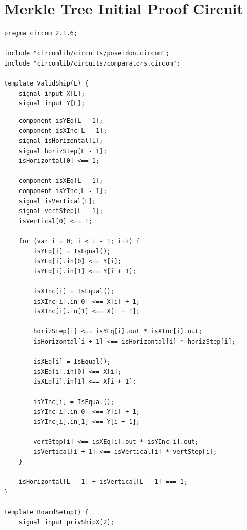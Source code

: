 \section{Merkle Tree Initial Proof Circuit}
\label{sec:initialProofCircuit}

\begin{listing}[H]
    \ContinuedFloat*
    \begin{verbatim}
pragma circom 2.1.6;

include "circomlib/circuits/poseidon.circom";
include "circomlib/circuits/comparators.circom";

template ValidShip(L) {
    signal input X[L];
    signal input Y[L];
    \end{verbatim}
    \caption{Merkle tree commitment for two coordinates.}
    \label{lst:initialProofCircuitMerkleA}
\end{listing}

\begin{listing}[H]
    \ContinuedFloat
    \begin{verbatim}
    component isYEq[L - 1];
    component isXInc[L - 1];
    signal isHorizontal[L];
    signal horizStep[L - 1];
    isHorizontal[0] <== 1;

    component isXEq[L - 1];
    component isYInc[L - 1];
    signal isVertical[L];
    signal vertStep[L - 1];
    isVertical[0] <== 1;

    for (var i = 0; i < L - 1; i++) {
        isYEq[i] = IsEqual();
        isYEq[i].in[0] <== Y[i];
        isYEq[i].in[1] <== Y[i + 1];

        isXInc[i] = IsEqual();
        isXInc[i].in[0] <== X[i] + 1;
        isXInc[i].in[1] <== X[i + 1];

        horizStep[i] <== isYEq[i].out * isXInc[i].out;
        isHorizontal[i + 1] <== isHorizontal[i] * horizStep[i];

        isXEq[i] = IsEqual();
        isXEq[i].in[0] <== X[i];
        isXEq[i].in[1] <== X[i + 1];

        isYInc[i] = IsEqual();
        isYInc[i].in[0] <== Y[i] + 1;
        isYInc[i].in[1] <== Y[i + 1];

        vertStep[i] <== isXEq[i].out * isYInc[i].out;
        isVertical[i + 1] <== isVertical[i] * vertStep[i];
    }

    isHorizontal[L - 1] + isVertical[L - 1] === 1;
}

template BoardSetup() {
    signal input privShipX[2];
    \end{verbatim}
    \caption{Merkle tree commitment for two coordinates (continued).}
    \label{lst:initialProofCircuitMerkleB}
\end{listing}

